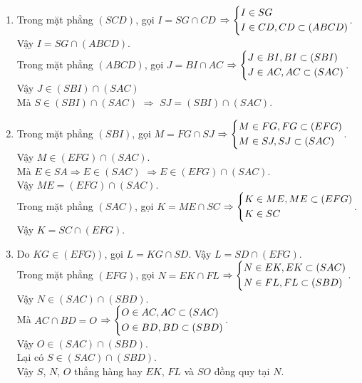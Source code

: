 \begin{bt}
{\begin{center}
\end{center}
\begin{enumerate}
\item  Trong mặt phẳng $\left(SCD\right)$, gọi $I=SG\cap CD$ $\Rightarrow \left\{\begin{aligned}
& I\in SG \\ 
& I\in CD,CD\subset \left(ABCD\right) \\ 
\end{aligned}\right.$.\\
 Vậy $I=SG\cap \left(ABCD\right)$.\\
Trong mặt phẳng $\left(ABCD\right)$, gọi $J=BI\cap AC$ $\Rightarrow \left\{\begin{aligned}
& J\in BI,BI\subset \left(SBI\right) \\ 
& J\in AC,AC\subset \left(SAC\right) \\ 
\end{aligned}\right.$. \\
Vậy $J\in \left(SBI\right)\cap \left(SAC\right)$\\
Mà $S\in \left(SBI\right)\cap \left(SAC\right)$ $\Rightarrow $ $SJ = \left(SBI\right)\cap \left(SAC\right)$.
\item Trong mặt phẳng $\left(SBI\right)$, gọi $M=FG\cap SJ$ $\Rightarrow \left\{\begin{aligned}
& M\in FG,FG\subset \left(EFG\right) \\ 
& M\in SJ,SJ\subset \left(SAC\right) \\ 
\end{aligned}\right.$.\\
 Vậy $M\in \left(EFG\right)\cap \left(SAC\right)$.\\
Mà $E\in SA\Rightarrow E\in \left(SAC\right)$ $\Rightarrow E\in \left(EFG\right)\cap \left(SAC\right)$.\\
Vậy $ME=\left(EFG\right)\cap \left(SAC\right)$.\\
Trong mặt phẳng $\left(SAC\right)$, gọi $K=ME\cap SC$ $\Rightarrow \left\{\begin{aligned}
& K\in ME,ME\subset \left(EFG\right) \\ 
& K\in SC \\ 
\end{aligned}\right.$.\\
 Vậy $K=SC\cap \left(EFG\right)$.
\item Do $KG \in \left(EFG)\right)$, gọi $L = KG \cap SD$. 
Vậy $L = SD \cap \left(EFG\right)$.\\
Trong mặt phẳng $\left(EFG\right)$, gọi $N=EK\cap FL$ $\Rightarrow \left\{\begin{aligned}
& N\in EK,EK\subset \left(SAC\right) \\ 
& N\in FL,FL\subset \left(SBD\right) \\ 
\end{aligned}\right.$.\\
 Vậy $N\in \left(SAC\right)\cap \left(SBD\right)$.\\
Mà $AC\cap BD=O$ $\Rightarrow \left\{\begin{aligned}
& O\in AC,AC\subset \left(SAC\right) \\ 
& O\in BD,BD\subset \left(SBD\right) \\ 
\end{aligned}\right.$. \\
Vậy $O\in \left(SAC\right)\cap \left(SBD\right)$.\\
Lại có $S\in \left(SAC\right)\cap \left(SBD\right)$.\\
Vậy $S$, $N$, $O$ thẳng hàng hay $EK$, $FL$ và $SO$ đồng quy tại $N$.
\end{enumerate}
}
\end{bt}



